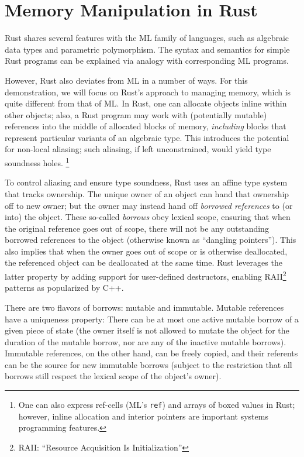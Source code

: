 \documentclass{acm_proc_article-sp}
\begin{document}
\section{Memory Manipulation in Rust}

Rust shares several features with the ML family of languages,
such as algebraic data types and parametric polymorphism.  The syntax
and semantics for simple Rust programs can be explained via
analogy with corresponding ML programs.

However, Rust also deviates from ML in a number of ways.  For this
demonstration, we will focus on Rust's approach to managing
memory, which is quite different from that of ML.
In Rust, one can allocate objects inline within other objects;
also, a Rust program may work with (potentially mutable) references into the
middle of allocated blocks of memory, \emph{including} blocks that represent
particular variants of an algebraic type.
This introduces the potential for non-local aliasing;
such aliasing, if left unconstrained, would yield type soundness holes.%
\footnote{One can also express ref-cells (ML's {\tt ref}) and
  arrays of boxed values in Rust; however, inline
  allocation and interior pointers are important systems
  programming features.}

To control aliasing and ensure type soundness, Rust uses an affine
type system that tracks ownership.  The unique owner of an object can
hand that ownership off to new owner; but the owner may instead hand
off {\em borrowed references} to (or into) the object.  These
so-called \emph{borrows} obey lexical scope, ensuring that when the
original reference goes out of scope, there will not be any
outstanding borrowed references to the object (otherwise known as
``dangling pointers'').  This also implies that when the owner goes
out of scope or is otherwise deallocated, the referenced object can be
deallocated at the same time. Rust leverages the latter property by
adding support for user-defined destructors, enabling RAII\footnote{%
RAII: ``Resource Acquisition Is Initialization''}
patterns as popularized by C++.

There are two flavors of borrows: mutable and immutable.
Mut\-able references have a uniqueness property:
There can be at
most one active mutable borrow of a given piece of state (the owner
itself is not allowed to mutate the object for the duration of the
mutable borrow, nor are any of the inactive mutable borrows).
Immutable references, on the other hand,
can be freely copied, and their referents can be the source for new
immutable borrows (subject to the restriction that all borrows
still respect the lexical scope of the object's owner).
\end{document}
